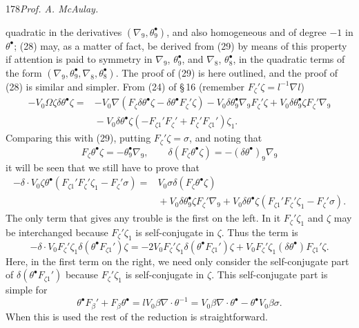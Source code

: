 \documentclass[11pt]{article}
\begin{document}
\newpage\thispagestyle{empty}\begin{center}178\hfill \textit{Prof. A. McAulay.}\end{center}
quadratic in the derivatives $(\nabla_9,\theta^\bullet_9)$, and also homogeneous and of degree $-1$ in $\theta^\bullet$; (28) may, as a matter of fact, be derived from (29) by means of this property if attention is paid to symmetry in $\nabla_9$, $\theta^\bullet_9$, and $\nabla_8$, $\theta^\bullet_8$, in the quadratic terms of the form $(\nabla_9,\theta^\bullet_9,\nabla_8,\theta^\bullet_8)$. The proof of (29) is here outlined, and the proof of (28) is similar and simpler. From (24) of \S\,16 (remember $F_\zeta'\zeta=l^{-1}\nabla l$)
\[
  \begin{aligned}
  -V_0\Omega\zeta\delta\theta^\bullet\zeta={}&-V_0\nabla(F_\zeta\delta\theta^\bullet\zeta-\delta\theta^\bullet F_\zeta'\zeta)
    -V_0\delta\theta^\bullet_9\nabla_9F_\zeta'\zeta+V_0\delta\theta^\bullet_9\zeta F_\zeta'\nabla_9\\
   &{}-V_0\delta\theta^\bullet\zeta(-F_{\zeta1}'F_\zeta'+F_\zeta'F_{\zeta1}')\zeta_1.
  \end{aligned}
\]
Comparing this with (29), putting $F_\zeta'\zeta=\sigma$, and noting that
\[
  F_\zeta\theta^\bullet\zeta=-\theta^\bullet_9\nabla_9,\qquad
  \delta(F_\zeta\theta^\bullet\zeta)=-(\delta\theta^\bullet)_9\nabla_9
  \tag{30}
\]
it will be seen that we still have to prove that
\[
  \begin{aligned}
  -\delta\mathbin{\cdot}V_0\zeta\theta^\bullet(F_{\zeta1}'F_\zeta'\zeta_1-F_\zeta'\sigma)
  ={}&V_0\sigma\delta(F_\zeta\theta^\bullet\zeta)\\
   &{}+V_0\delta\theta^\bullet_9\zeta F_\zeta'\nabla_9
    +V_0\delta\theta^\bullet\zeta(F_{\zeta1}'F_\zeta'\zeta_1-F_\zeta'\sigma).
  \end{aligned}
\]
The only term that gives any trouble is the first on the left. In it $F_\zeta'\zeta_1$ and $\zeta$ may be interchanged because $F_\zeta'\zeta_1$ is self-conjugate in $\zeta$. Thus the term is
\[
  -\delta\mathbin{\cdot}V_0F_\zeta'\zeta_1\delta(\theta^\bullet F_{\zeta1}')\zeta
  =-2V_0F_\zeta'\zeta_1\delta(\theta^\bullet F_{\zeta1}')\zeta+V_0F_\zeta'\zeta_1(\delta\theta^\bullet)F_{\zeta1}'\zeta.
\]
Here, in the first term on the right, we need only consider the self-conjugate part of $\delta(\theta^\bullet F_{\zeta1}')$ because $F_\zeta'\zeta_1$ is self-conjugate in $\zeta$. This self-conjugate part is simple for
\[
  \theta^\bullet F_\beta'+F_\beta\theta^\bullet=lV_0\beta\nabla\mathbin{\cdot}\theta^{-1}=V_0\beta\nabla\mathbin{\cdot}\theta^\bullet-\theta^\bullet V_0\beta\sigma.
\]
When this is used the rest of the reduction is straightforward.
\end{document}
